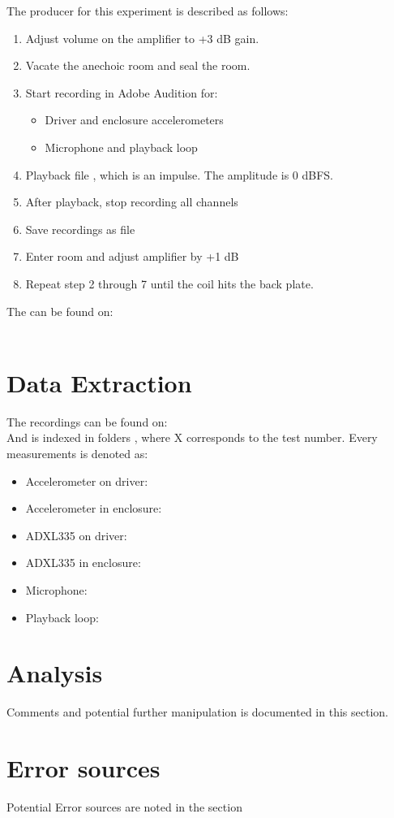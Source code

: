 The producer for this experiment is described as follows:
\begin{enumerate}
\item Adjust volume on the amplifier to +3 dB gain.
\item Vacate the anechoic room and seal the room.
\item Start recording in Adobe Audition for:
\begin{itemize}
\item Driver and enclosure accelerometers
\item Microphone and playback loop
\end{itemize}
\item Playback file , which is an impulse. The amplitude is 0 dBFS.
\item After playback, stop recording all channels
\item Save recordings as  file
\item Enter room and adjust amplifier by +1 dB
\item Repeat step 2 through 7 until the coil hits the back plate.
\end{enumerate}

The  can be found on:\\
\\

\section{Data Extraction}

The recordings can be found on:\\
And is indexed in folders , where X corresponds to the test number. Every measurements is denoted as:
\begin{itemize}
\item Accelerometer on driver: 
\item Accelerometer in enclosure: 
\item ADXL335 on driver: 
\item ADXL335 in enclosure: 
\item Microphone: 
\item Playback loop: 
\end{itemize}

\section{Analysis}

Comments and potential further manipulation is documented in this section. 

\section{Error sources}

Potential Error sources are noted in the section

